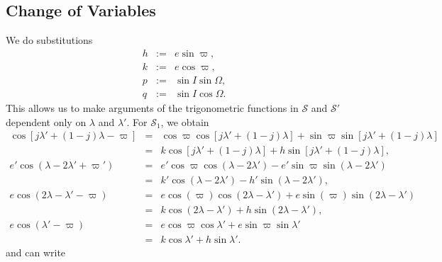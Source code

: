 \documentclass [12pt, a4paper] {article}
\begin{document}
\subsection{Change of Variables}
We do substitutions
\begin {eqnarray}
    h &:=& e\sin\varpi, 
    \\
    k &:=& e\cos\varpi, 
    \\
    p &:=& \sin I\sin\Omega, 
    \\
    q &:=& \sin I\cos\Omega.
\end {eqnarray}
This allows us to make arguments of the trigonometric functions in $\mathcal S$ and 
$\mathcal S'$ dependent only on $\lambda$ and $\lambda'$. For $\mathcal S_1$,
we obtain 
\begin {eqnarray}
    \cos[j\lambda' + (1 - j)\lambda - \varpi]
    &=& 
    \cos\varpi\cos[j\lambda' + (1-j)\lambda]
    +
    \sin\varpi\sin[j\lambda' + (1-j)\lambda]
    \\
    &=& 
    k\cos[j\lambda' + (1-j)\lambda]
    +
    h\sin[j\lambda' + (1-j)\lambda],
    \\
    e' \cos(\lambda - 2\lambda' + \varpi')
    &=& 
    e' \cos\varpi\cos(\lambda - 2\lambda')
    -
    e' \sin\varpi\sin(\lambda - 2\lambda')
    \\
    &=& 
    k' \cos(\lambda - 2\lambda')
    -
    h' \sin(\lambda - 2\lambda'),
    \\
    e\cos(2\lambda - \lambda' - \varpi)
    &=& 
    e\cos(\varpi)\cos(2\lambda - \lambda')
    + 
    e\sin(\varpi)\sin(2\lambda - \lambda')
    \\
    &=& 
    k\cos(2\lambda - \lambda')
    +
    h\sin(2\lambda - \lambda'),
    \\
    e\cos(\lambda' - \varpi)
    &=& 
    e\cos\varpi\cos\lambda'
    +
    e\sin\varpi\sin\lambda'
    \\
    &=& 
    k\cos\lambda'
    +
    h\sin\lambda'.
\end {eqnarray}
and can write 
\end{document}
